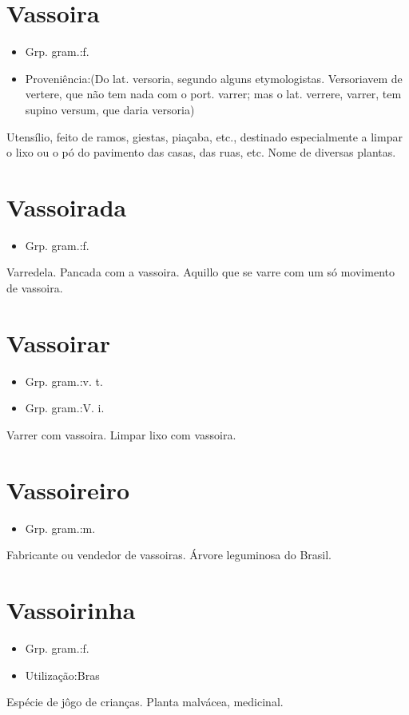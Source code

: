 \documentclass{article}
\begin{document}
\section{Vassoira}
\begin{itemize}
\item {Grp. gram.:f.}
\end{itemize}
\begin{itemize}
\item {Proveniência:(Do lat. \textunderscore versoria\textunderscore , segundo alguns etymologistas. \textunderscore Versoria\textunderscore  vem de \textunderscore vertere\textunderscore , que não tem nada com o port. \textunderscore varrer\textunderscore ; mas o lat. \textunderscore verrere\textunderscore , varrer, tem supino \textunderscore versum\textunderscore , que daria \textunderscore versoria\textunderscore )}
\end{itemize}
Utensílio, feito de ramos, giestas, piaçaba, etc., destinado especialmente a limpar o lixo ou o pó do pavimento das casas, das ruas, etc.
Nome de diversas plantas.
\section{Vassoirada}
\begin{itemize}
\item {Grp. gram.:f.}
\end{itemize}
Varredela.
Pancada com a vassoira.
Aquillo que se varre com um só movimento de vassoira.
\section{Vassoirar}
\begin{itemize}
\item {Grp. gram.:v. t.}
\end{itemize}
\begin{itemize}
\item {Grp. gram.:V. i.}
\end{itemize}
Varrer com vassoira.
Limpar lixo com vassoira.
\section{Vassoireiro}
\begin{itemize}
\item {Grp. gram.:m.}
\end{itemize}
Fabricante ou vendedor de vassoiras.
Árvore leguminosa do Brasil.
\section{Vassoirinha}
\begin{itemize}
\item {Grp. gram.:f.}
\end{itemize}
\begin{itemize}
\item {Utilização:Bras}
\end{itemize}
Espécie de jôgo de crianças.
Planta malvácea, medicinal.
\end{document}
